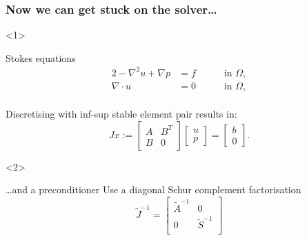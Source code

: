 \documentclass[presentation,aspectratio=43, 10pt]{beamer}
\begin{document}
\begin{frame}[t]
  \frametitle{Now we can get stuck on the solver\dots}
  \begin{onlyenv}<1>
    \begin{block}{Stokes equations}
      \begin{alignat*}{2}
        -\nabla^2 u + \nabla p &= f \quad && \text{ in } \Omega, \\
        \nabla \cdot u &= 0 \quad && \text{ in } \Omega, \\
      \end{alignat*}

      Discretising with inf-sup stable element pair results in:
      \begin{equation*}
        Jx := \begin{bmatrix}
          A & B^T \\
          B & 0
        \end{bmatrix}
        \begin{bmatrix}
          u \\ p
        \end{bmatrix}
        =
        \begin{bmatrix}
          b \\ 0
        \end{bmatrix}.
      \end{equation*}
    \end{block}
  \end{onlyenv}
  \begin{onlyenv}<2>
    \begin{block}{\dots and a preconditioner}
      Use a diagonal Schur complement factorisation
      \parencite{Silvester:1994}
      \begin{equation*}
        \tilde{J}^{-1} =
        \begin{bmatrix}
          \tilde{A}^{-1}  & 0 \\
          0 & \tilde{S}^{-1} \\
        \end{bmatrix}
      \end{equation*}


\end{block}
\end{onlyenv}
\end{frame}
\end{document}
